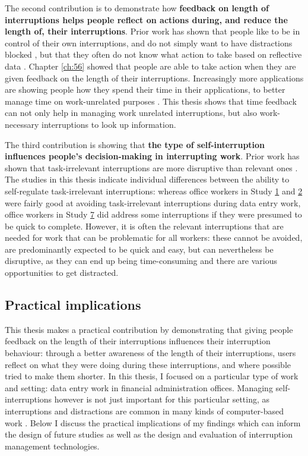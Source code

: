 The second contribution is to demonstrate how \textbf{feedback on length of interruptions helps people reflect on actions during, and reduce the length of, their interruptions}. Prior work has shown that people like to be in control of their own interruptions, and do not simply want to have distractions blocked \citep{Mark2018}, but that they often do not know what action to take based on reflective data \citep{Collins2014, Whittaker2016}. Chapter \ref{ch:56} showed that people are able to take action when they are given feedback on the length of their interruptions. Increasingly more applications are showing people how they spend their time in their applications, to better manage time on work-unrelated purposes \citep{Constine2018, Constine2018a, Lynley2018}. This thesis shows that time feedback can not only help in managing work unrelated interruptions, but also work-necessary interruptions to look up information.

The third contribution is showing that \textbf{the type of self-interruption influences people’s decision-making in interrupting work}. Prior work has shown that task-irrelevant interruptions are more disruptive than relevant ones \citep{Iqbal2008}. The studies in this thesis indicate individual differences between the ability to self-regulate task-irrelevant interruptions: whereas office workers in Study \hyperref[st:Study1]{1} and \hyperref[st:Study2]{2} were fairly good at avoiding task-irrelevant interruptions during data entry work, office workers in Study \hyperref[st:Study7]{7} did address some interruptions if they were presumed to be quick to complete. However, it is often the relevant interruptions that are needed for work that can be problematic for all workers: these cannot be avoided, are predominantly expected to be quick and easy, but can nevertheless be disruptive, as they can end up being time-consuming and there are various opportunities to get distracted. 

\subsection{Practical implications}
This thesis makes a practical contribution by demonstrating that giving people feedback on the length of their interruptions influences their interruption behaviour: through a better awareness of the length of their interruptions, users reflect on what they were doing during these interruptions, and where possible tried to make them shorter. In this thesis, I focused on a particular type of work and setting: data entry work in financial administration offices. Managing self-interruptions however is not just important for this particular setting, as interruptions and distractions are common in many kinds of computer-based work \citep{Gonzalez2004}. Below I discuss the practical implications of my findings which can inform the design of future studies as well as the design and evaluation of interruption management technologies. 


